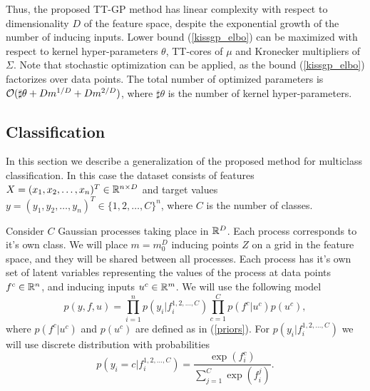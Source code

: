   Thus, the proposed TT-GP method has linear complexity with respect to dimensionality
  $D$ of the feature space, despite the exponential growth of the number of 
  inducing inputs. Lower bound  (\ref{kissgp_elbo})
  can be maximized with respect to kernel hyper-parameters $\theta$, TT-cores
  of $\mu$ and Kronecker multipliers of $\Sigma$. Note that stochastic optimization
  can be applied, as the bound (\ref{kissgp_elbo}) factorizes over data points.
  The total number of optimized parameters is 
  $\mathcal{O}(\sharp \theta + D m^{1/D} + D m^{2/D})$, where $\sharp\theta$ is the number of
  kernel hyper-parameters.

  

\subsection{Classification}
  
  In this section we describe a generalization of the proposed method for 
  multiclass classification. In this case the dataset consists of features 
  $X = (x_1, x_2, \ldots, x_n)^T \in \mathbb{R}^{n \times D}$ and target values
  $y = (y_1, y_2, \ldots, y_n)^T \in \{1, 2, \ldots, C\}^n$, where $C$ is the 
  number of classes.

  Consider $C$ Gaussian processes taking place in $\mathbb{R}^D$. Each process 
  corresponds to it's own class. We will place $m = m_0^D$ inducing points $Z$ on a grid
  in the feature space, and they will be shared between all processes. Each
  process has it's own set of latent variables representing the values of 
  the process at data points $f^c \in \mathbb{R}^n$, and inducing inputs $u^c \in \mathbb{R}^m$.
  We will use the following model
  \[
    p(y, f, u) = \prod_{i=1}^n p(y_i | f_i^{1, 2, \ldots, C}) 
      \prod_{c=1}^C p(f^c | u^c) p(u^c),
  \]
  where $p(f^c | u^c)$ and $p(u^c)$ are defined as in (\ref{priors}).
  For $p(y_i | f_i^{1,2, \ldots, C})$ we will use discrete distribution with
  probabilities
  \[
    p(y_i = c | f_i^{1, 2, \ldots, C}) = \frac{\exp(f_i^c)} {\sum_{j=1}^{C} \exp(f_i^j)}.
  \]

